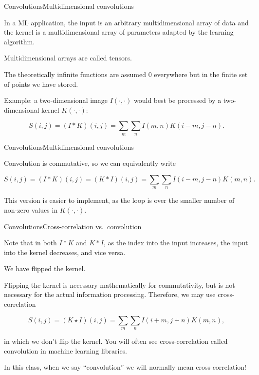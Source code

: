 \documentclass[aspectratio=169]{beamer}
\begin{document}
\begin{frame}{Convolutions}{Multidimensional convolutions}

In a ML application, the input is an arbitrary \alert{multidimensional
  array of data} and the kernel is a \alert{multidimensional array of
  parameters} adapted by the learning algorithm.

\medskip

Multidimensional arrays are called \alert{tensors}.

\medskip

The theoretically infinite functions are assumed 0 everywhere but in
the finite set of points we have stored.

\medskip

Example: a two-dimensional image $I(\cdot,\cdot)$ would best be processed by a
two-dimensional kernel $K(\cdot,\cdot)$:

$$ S(i,j) = (I * K)(i, j) = \sum_m \sum_n I(m,n)K(i-m,j-n). $$

\end{frame}


\begin{frame}{Convolutions}{Multidimensional convolutions}

Convolution is \alert{commutative}, so we can equivalently write

$$ S(i,j) = (I * K)(i,j) = (K * I)(i,j) =
\sum_m \sum_n I(i-m,j-n)K(m,n).$$

This version is easier to implement, as the loop is over the smaller
number of non-zero values in $K(\cdot,\cdot)$.

\end{frame}


\begin{frame}{Convolutions}{Cross-correlation vs.\ convolution}

Note that in both $I * K$ and $K * I$, as the index into the
input \alert{increases}, the input into the kernel \alert{decreases},
and vice versa.

\medskip

We have \alert{flipped} the kernel.

\medskip

Flipping the kernel is necessary mathematically for commutativity, but
is not necessary for the actual information processing. Therefore, we
may use \alert{cross-correlation}

$$S(i,j) = (K \star I)(i,j) = \sum_m \sum_n I(i+m,j+n)K(m,n),$$

in which we don't flip the kernel. You will often see cross-correlation
called convolution in machine learning libraries.

\medskip

In this class, when we say ``convolution'' we will normally mean cross
correlation!

\end{frame}
\end{document}
